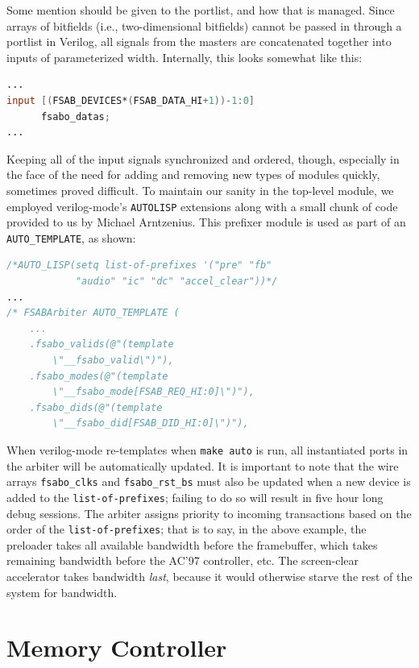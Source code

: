 \documentclass[10pt]{article}
\begin{document}
Some mention should be given to the portlist, and how that is managed. Since
arrays of bitfields (i.e., two-dimensional bitfields) cannot be passed in
through a portlist in Verilog, all signals from the masters are concatenated
together into inputs of parameterized width. Internally, this looks somewhat
like this:

\begin{lstlisting}[basicstyle=\footnotesize,language=Verilog]
...
input [(FSAB_DEVICES*(FSAB_DATA_HI+1))-1:0]
      fsabo_datas;
...
\end{lstlisting}


Keeping all of the input signals synchronized and ordered, though,
especially in the face of the need for adding and removing new types of
modules quickly, sometimes proved difficult. To maintain our sanity in the
top-level module, we employed verilog-mode's \texttt{AUTOLISP} extensions along with
a small chunk of code provided to us by Michael Arntzenius. This prefixer
module is used as part of an \texttt{AUTO\_TEMPLATE}, as shown:

\begin{lstlisting}[basicstyle=\footnotesize,language=Verilog]
/*AUTO_LISP(setq list-of-prefixes '("pre" "fb"
            "audio" "ic" "dc" "accel_clear"))*/
...
/* FSABArbiter AUTO_TEMPLATE (
    ...
    .fsabo_valids(@"(template
        \"__fsabo_valid\")"),
    .fsabo_modes(@"(template
        \"__fsabo_mode[FSAB_REQ_HI:0]\")"),
    .fsabo_dids(@"(template
        \"__fsabo_did[FSAB_DID_HI:0]\")"),
\end{lstlisting}

When verilog-mode re-templates when \texttt{make auto} is run, all
instantiated ports in the arbiter will be automatically updated.  It is
important to note that the wire arrays \texttt{fsabo\_clks} and
\texttt{fsabo\_rst\_bs} must also be updated when a new device is added to the
\texttt{list-of-prefixes}; failing to do so will result in five hour long
debug sessions.  The arbiter assigns priority to incoming transactions based
on the order of the \texttt{list-of-prefixes}; that is to say, in the above
example, the preloader takes all available bandwidth before the framebuffer,
which takes remaining bandwidth before the AC'97 controller, etc.  The
screen-clear accelerator takes bandwidth \textit{last}, because it would otherwise
starve the rest of the system for bandwidth.

\section{Memory Controller}
\end{document}
